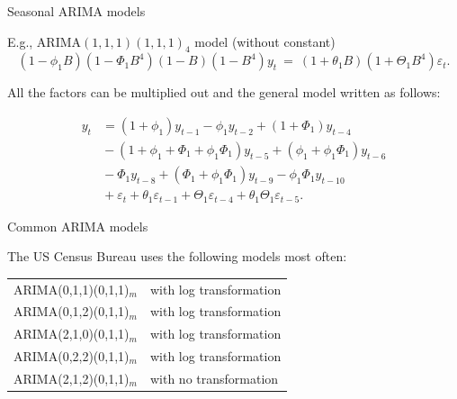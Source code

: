 \documentclass[14pt,ignorenonframetext,]{beamer}
\begin{document}
\begin{frame}{Seasonal ARIMA models}

E.g., ARIMA\((1, 1, 1)(1, 1, 1)_{4}\) model (without constant)
\[(1 - \phi_{1}B)(1 - \Phi_{1}B^{4}) (1 - B) (1 - B^{4})y_{t} ~= ~
(1 + \theta_{1}B) (1 + \Theta_{1}B^{4})\varepsilon_{t}.
\]

All the factors can be multiplied out and the general model written as
follows:

\begin{align*}
y_{t}  &= (1 + \phi_{1})y_{t - 1} - \phi_1y_{t-2} + (1 + \Phi_{1})y_{t - 4}\\
&\text{}
 -  (1  + \phi_{1}  +  \Phi_{1} + \phi_{1}\Phi_{1})y_{t - 5}
 +  (\phi_{1}  +  \phi_{1} \Phi_{1}) y_{t - 6} \\
& \text{}  - \Phi_{1} y_{t - 8} +  (\Phi_{1}  +  \phi_{1} \Phi_{1}) y_{t - 9}
  - \phi_{1} \Phi_{1} y_{t  -  10}\\
  &\text{}
+    \varepsilon_{t} + \theta_{1}\varepsilon_{t - 1} + \Theta_{1}\varepsilon_{t - 4}  + \theta_{1}\Theta_{1}\varepsilon_{t - 5}.
\end{align*}

\vspace*{10cm}

\end{frame}

\begin{frame}{Common ARIMA models}

The US Census Bureau uses the following models most
often:\vspace*{0.5cm}

\begin{tabular}{|ll|}
\hline
ARIMA(0,1,1)(0,1,1)$_m$& with log transformation\\
ARIMA(0,1,2)(0,1,1)$_m$& with log transformation\\
ARIMA(2,1,0)(0,1,1)$_m$& with log transformation\\
ARIMA(0,2,2)(0,1,1)$_m$& with log transformation\\
ARIMA(2,1,2)(0,1,1)$_m$& with no transformation\\
\hline
\end{tabular}

\end{frame}
\end{document}

